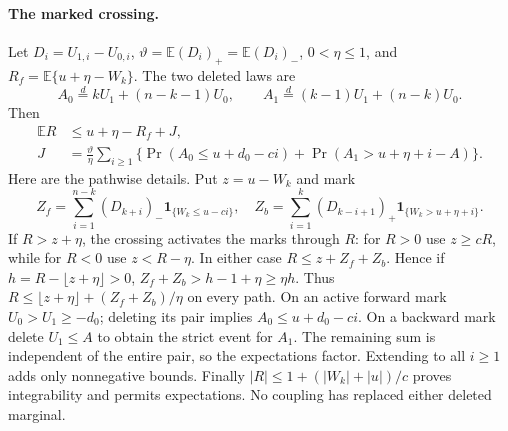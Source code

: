 \paragraph{The marked crossing.}
Let $D_i=U_{1,i}-U_{0,i}$, $\vartheta=\mathbb E(D_i)_+=\mathbb E(D_i)_-$,
$0<\eta\le1$, and $R_f=\mathbb E\{u+\eta-W_k\}$. The two deleted laws are
\[
 A_0\overset{d}=kU_1+(n-k-1)U_0,\qquad
 A_1\overset{d}=(k-1)U_1+(n-k)U_0.
\]
Then
\begin{align}
 \mathbb ER&\le u+\eta-R_f+J,\label{shortloc:mark}\\
 J&=\frac{\vartheta}{\eta}\sum_{i\ge1}
 \{\Pr(A_0\le u+d_0-ci)+\Pr(A_1>u+\eta+i-A)\}.\nonumber
\end{align}
Here are the pathwise details. Put $z=u-W_k$ and mark
\[
 Z_f=\sum_{i=1}^{n-k}(D_{k+i})_-\mathbf1_{\{W_k\le u-ci\}},\quad
 Z_b=\sum_{i=1}^{k}(D_{k-i+1})_+\mathbf1_{\{W_k>u+\eta+i\}}.
\]
If $R>z+\eta$, the crossing activates the marks through $R$: for $R>0$
use $z\ge cR$, while for $R<0$ use $z<R-\eta$. In either case
$R\le z+Z_f+Z_b$. Hence if $h=R-\lfloor z+\eta\rfloor>0$,
$Z_f+Z_b>h-1+\eta\ge\eta h$. Thus
$R\le\lfloor z+\eta\rfloor+(Z_f+Z_b)/\eta$ on every path.
On an active forward mark $U_0>U_1\ge-d_0$; deleting its pair implies
$A_0\le u+d_0-ci$. On a backward mark delete $U_1\le A$ to obtain the
strict event for $A_1$. The remaining sum is independent of the entire
pair, so the expectations factor. Extending to all $i\ge1$ adds only
nonnegative bounds. Finally $|R|\le1+(|W_k|+|u|)/c$ proves integrability
and permits expectations. No coupling has replaced either deleted marginal.


